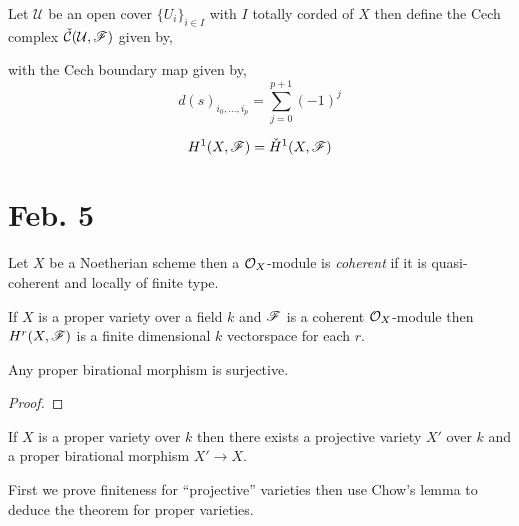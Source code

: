 \documentclass[12pt]{article}
\begin{document}
\begin{definition}
Let $\mathcal{U}$ be an open cover $\{U_i\}_{i \in I}$ with $I$ totally corded of $X$ then define the Cech complex $ \check{\mathcal{C}}(\mathcal{U}, \mathscr{F})$
given by,
\begin{center}
\end{center}
with the Cech boundary map given by,
\[ d(s)_{i_0, \dots, i_p} = \sum_{j = 0}^{p + 1} (-1)^j \]

\end{definition}

\begin{theorem}
\[ H^1(X, \mathscr{F}) = \check{H}^1(X, \mathscr{F}) \]
\end{theorem}


\section{Feb. 5}

\begin{definition}
Let $X$ be a Noetherian scheme then a $\mathcal{O}_{X}$-module is \textit{coherent} if it is quasi-coherent and locally of finite type. 
\end{definition}

\begin{theorem}
If $X$ is a proper variety over a field $k$ and $\mathscr{F}$ is a coherent $\mathcal{O}_{X}$-module then $H^r(X, \mathscr{F})$ is a finite dimensional $k$ vectorspace for each $r$. 
\end{theorem}

\begin{lemma}
Any proper birational morphism is surjective.
\end{lemma}

\begin{proof}

\end{proof}

\begin{lemma}[Chow] 
If $X$ is a proper variety over $k$ then there exists a projective variety $X'$ over $k$ and a proper birational morphism $X' \to X$.
\end{lemma}

\begin{remark}
First we prove finiteness for ``projective'' varieties then use Chow's lemma to deduce the theorem for proper varieties. 
\end{remark}
\end{document}
